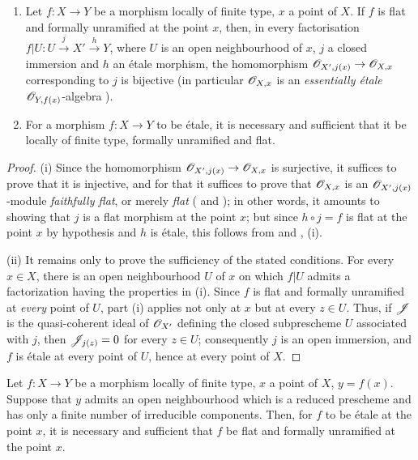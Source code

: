 \begin{corollary}[18.4.12]
\label{IV.18.4.12}
\begin{enumerate}
  \item[\textup{(i)}] Let $f:X\to Y$ be a morphism locally of finite type, $x$ a point of $X$.
If $f$ is flat and formally unramified at the point $x$, then, in every factorisation $f|U:U\xrightarrow{j}X'\xrightarrow{h}Y$, where $U$ is an open neighbourhood of $x$, $j$ a closed immersion and $h$ an \'etale morphism, the homomorphism $\mathscr{O}_{X',j(x)}\to\mathscr{O}_{X,x}$ corresponding to $j$ is bijective \textup{(in particular $\mathscr{O}_{X,x}$ is an \emph{essentially \'etale} $\mathscr{O}_{Y,f(x)}$-algebra )}.
  \item[\textup{(ii)}] For a morphism $f:X\to Y$ to be \'etale, it is necessary and sufficient that it be locally of finite type, formally unramified and flat.
\end{enumerate}
\end{corollary}

\begin{proof}
(i) Since the homomorphism $\mathscr{O}_{X',j(x)}\to\mathscr{O}_{X,x}$ is surjective, it suffices to prove that it is injective, and for that it suffices to prove that $\mathscr{O}_{X,x}$ is an $\mathscr{O}_{X',j(x)}$-module \emph{faithfully flat}, or merely \emph{flat} ( and );
in other words, it amounts to showing that $j$ is a flat morphism at the point $x$;
but since $h\circ j=f$ is flat at the point $x$ by hypothesis and $h$ is \'etale, this follows from  and , (i).

(ii) It remains only to prove the sufficiency of the stated conditions.
For every $x\in X$, there is an open neighbourhood $U$ of $x$ on which $f|U$ admits a factorization having the properties in (i).
Since $f$ is flat and formally unramified at \emph{every} point of $U$, part (i) applies not only at $x$ but at every $z\in U$.
Thus, if $\mathscr{J}$ is the quasi-coherent ideal of $\mathscr{O}_{X'}$ defining the closed subprescheme $U$ associated with $j$, then $\mathscr{J}_{j(z)}=0$ for every $z\in U$; consequently $j$ is an open immersion, and $f$ is \'etale at every point of $U$, hence at every point of $X$.
\end{proof}

\begin{corollary}[18.4.13]
\label{IV.18.4.13}
Let $f:X\to Y$ be a morphism locally of finite type, $x$ a point of $X$, $y=f(x)$.
Suppose that $y$ admits an open neighbourhood which is a reduced prescheme and has only a finite number of irreducible components.
Then, for $f$ to be \'etale at the point $x$, it is necessary and sufficient that $f$ be flat and formally unramified at the point $x$.
\end{corollary}

